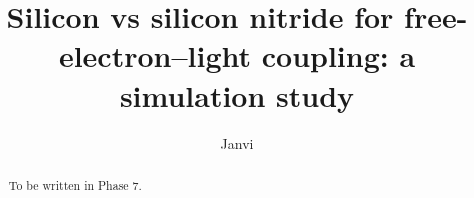 \documentclass[aps,prl,twocolumn]{revtex4-2}
\begin{document}
\title{Silicon vs silicon nitride for free-electron--light coupling: a simulation study}
\author{Janvi}

\begin{abstract}
To be written in Phase 7.
\end{abstract}

\maketitle
\end{document}
